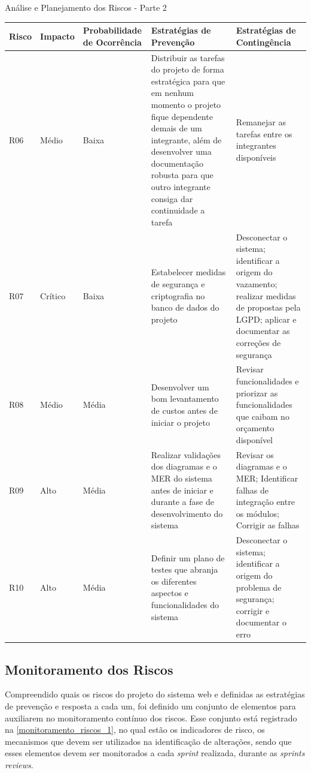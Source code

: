 \documentclass[
	12pt,				%
	openany,			%
	twoside,			%
	a4paper,			%
	english,			%
	french,				%
	spanish,			%
	brazil				%
	]{abntex2}
\begin{document}
 \begin{quadro}[H]
	\caption{Análise e Planejamento dos Riscos - Parte 2}
	\label{analise_riscos_2} 
	\begin{tabular} {|p{1cm}|p{1.6cm}|p{3cm}|p{4.7cm}|p{4.7cm}|}
		\hline
		\textbf{Risco} & \textbf{Impacto} & \textbf{Probabilidade de  Ocorrência} & \textbf{Estratégias de \newline Prevenção} & \textbf{Estratégias de \newline Contingência}\\
		\hline	
		R06 & Médio & Baixa & Distribuir as tarefas do projeto de forma estratégica  para que em nenhum momento o projeto fique dependente demais de um integrante, além de desenvolver uma documentação robusta para que outro integrante consiga dar continuidade a tarefa & Remanejar as tarefas entre os integrantes disponíveis \\
		\hline
			
	 	R07 & Crítico & Baixa & Estabelecer medidas de segurança e criptografia no banco de dados do projeto & Desconectar o sistema; identificar a origem do vazamento; realizar medidas de propostas pela LGPD; aplicar e documentar as correções de segurança \\
	 	\hline
	 	R08 & Médio & Média & Desenvolver um bom levantamento de custos antes de iniciar o projeto & Revisar funcionalidades e priorizar as funcionalidades que caibam no orçamento disponível \\
	 	\hline
	 	R09 & Alto & Média & Realizar validações dos diagramas e o MER do sistema antes de iniciar e durante a fase de desenvolvimento do sistema & Revisar os diagramas e o MER; Identificar falhas de integração entre os módulos; Corrigir as falhas \\
	 	\hline
	 	R10 & Alto & Média & Definir um plano de testes que abranja os diferentes aspectos e funcionalidades do sistema & Desconectar o sistema; identificar a origem do problema de segurança; corrigir e documentar o erro \\ \hline
 	\end{tabular}
\end{quadro}
\subsection{Monitoramento dos Riscos}
Compreendido quais os riscos do projeto do sistema web e definidas as estratégias de prevenção e resposta a cada um, foi definido um conjunto de elementos para auxiliarem no monitoramento contínuo dos riscos. Esse conjunto está registrado na \autoref{monitoramento_riscos_1}, no qual estão os indicadores de risco, os mecanismos que devem ser utilizados na identificação de alterações, sendo que  esses elementos devem ser monitorados a cada \textit{sprint} realizada, durante as \textit{sprints reviews}.
\end{document}
